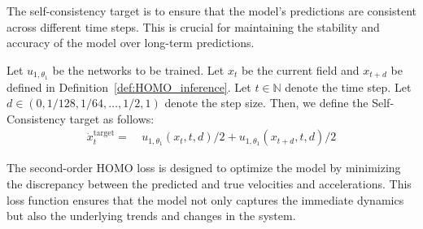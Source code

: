 The self-consistency target is to ensure that the model's predictions are consistent across different time steps. This is crucial for maintaining the stability and accuracy of the model over long-term predictions. 

\begin{definition}
\label{def:2nd_self_consistency_target}
Let $u_{1,\theta_1}$ be the networks to be trained.
Let $x_t$ be the current field and $x_{t+d}$ be defined in Definition~\ref{def:HOMO_inference}.
Let $t \in \mathbb{N}$ denote the time step. 
Let $d \in (0, 1 / 128, 1 / 64,\dots, 1 / 2, 1 )$ denote the step size.
Then, we define the Self-Consistency target as follows: 
\begin{align*}
    \dot{x}_t^{\mathrm{target}} = & ~ u_{1,\theta_1} ( x_t, t, d ) / 2 + u_{1,\theta_1}( x_{t + d}, t, d ) / 2 
\end{align*}
\end{definition}

The second-order HOMO loss is designed to optimize the model by minimizing the discrepancy between the predicted and true velocities and accelerations. This loss function ensures that the model not only captures the immediate dynamics but also the underlying trends and changes in the system. 

